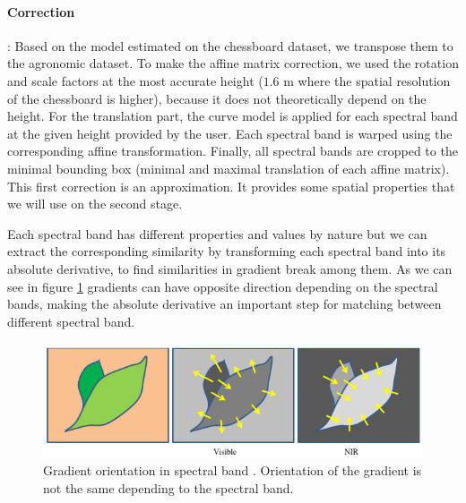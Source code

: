 \documentclass[../thesis.tex]{subfiles}
\begin{document}
	\paragraph{Correction} :
	Based on the model estimated on the chessboard dataset, we transpose them to the agronomic dataset.
	To make the affine matrix correction, we used the rotation and scale factors at the most accurate height
	($1.6$ m where the spatial resolution of the chessboard is higher), because it does not theoretically depend on the height.
	For the translation part, the curve model is applied for each spectral band at the given height provided by the user.
	Each spectral band is warped using the corresponding affine transformation.
	Finally, all spectral bands are cropped to the minimal bounding box (minimal and maximal translation of each affine matrix).
	This first correction is an approximation. It provides some spatial properties that we will use on the second stage.
	
	
	
	Each spectral band has different properties and values by nature
	but we can extract the corresponding similarity by transforming each spectral band into its absolute derivative,
	to find similarities in gradient break among them.
	As we can see in figure \ref{fig:vegetable-gradient}
	gradients can have opposite direction depending on the spectral bands,
	making the absolute derivative an important step for matching between different spectral band.
	
	\begin{figure}[H]
		\centering
		\includegraphics[width=0.5\linewidth]{img/registration/contrast-inversion}
		\caption{
			Gradient orientation in spectral band \cite{rabatel:hal-01684135}.
			Orientation of the gradient is not the same depending to the spectral band.
		}
		\label{fig:vegetable-gradient}
	\end{figure}
	
\end{document}
